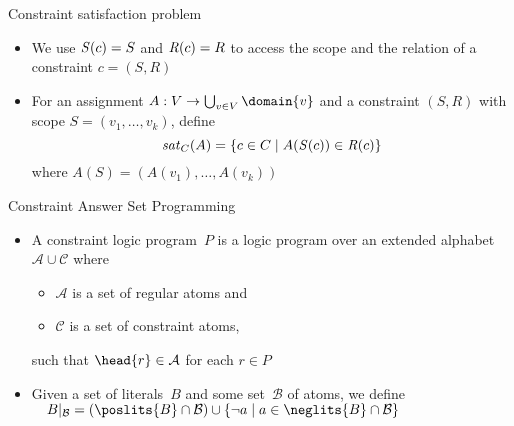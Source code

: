 \begin{frame}{Constraint satisfaction problem}
  \bigskip
  \begin{itemize}
  \item<1-> 
    We use $\mathit{S}(c)=S$ and $\mathit{R}(c)=R$ to access the scope and the relation
    of a constraint $c=(S,R)$
    \medskip
  \item<2-> For an assignment
    \(
    A: V\to \bigcup_{v\in V}\domain{v}
    \)
    and a constraint $(S,R)$
    with scope
    \(
    S=(v_1,\dots,v_k)
    \),
    define
    \[
    \mathit{sat}_C(A)
    =
    \{
    c\in C \mid A(\mathit{S}(c)) \in \mathit{R}(c)
    \}
    \]
    where
    \(
    A(S)
    =
    (A(v_1),\dots,A(v_k))
    \)
  \end{itemize}
\end{frame}
\begin{frame}{Constraint Answer Set Programming}
  \bigskip
  \begin{itemize}
  \item<1-> A \alert{constraint logic program}~$P$ is a logic program over an extended
    alphabet $\mathcal{A}\cup\mathcal{C}$
    where
    \begin{itemize}
    \item $\mathcal{A}$ is a set of \alert{regular atoms} and
    \item $\mathcal{C}$ is a set of \alert{constraint atoms},
    \end{itemize}
    such that $\head{r}\in\mathcal{A}$ for each $r\in P$
    \medskip
  \item<2-> Given a set of literals~$B$ and some set~$\mathcal{B}$ of atoms,
    we define
    \\\(\quad
    \project{B}{\mathcal{B}}
    =
    (\poslits{B}\cap\mathcal{B})
    \cup
    \{\neg a\mid a\in\neglits{B}\cap\mathcal{B}\}
    \)
  \end{itemize}
\end{frame}
